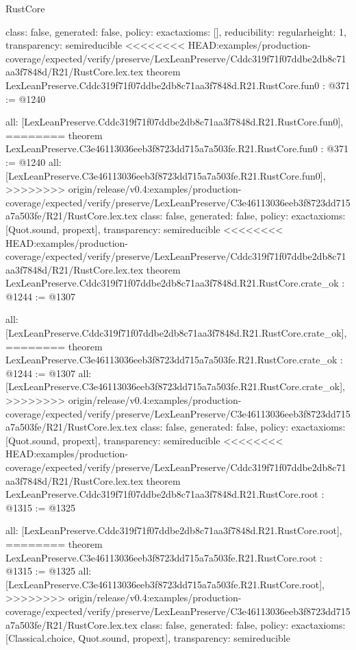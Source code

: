 \begin{lexlean}{RustCore}
\begin{coremodule}
{\begin{coremodule}
{{{  class: false,
  generated: false,
  policy: exact{axioms: []},
  reducibility: regular{height: 1},
  transparency: semireducible
}
<<<<<<<< HEAD:examples/production-coverage/expected/verify/preserve/LexLeanPreserve/Cddc319f71f07ddbe2db8c71aa3f7848d/R21/RustCore.lex.tex
theorem LexLeanPreserve.Cddc319f71f07ddbe2db8c71aa3f7848d.R21.RustCore.fun0 : @371 := @1240 {
  all: [LexLeanPreserve.Cddc319f71f07ddbe2db8c71aa3f7848d.R21.RustCore.fun0],
========
theorem LexLeanPreserve.C3e46113036eeb3f8723dd715a7a503fe.R21.RustCore.fun0 : @371 := @1240 {
  all: [LexLeanPreserve.C3e46113036eeb3f8723dd715a7a503fe.R21.RustCore.fun0],
>>>>>>>> origin/release/v0.4:examples/production-coverage/expected/verify/preserve/LexLeanPreserve/C3e46113036eeb3f8723dd715a7a503fe/R21/RustCore.lex.tex
  class: false,
  generated: false,
  policy: exact{axioms: [Quot.sound, propext]},
  transparency: semireducible
}
<<<<<<<< HEAD:examples/production-coverage/expected/verify/preserve/LexLeanPreserve/Cddc319f71f07ddbe2db8c71aa3f7848d/R21/RustCore.lex.tex
theorem LexLeanPreserve.Cddc319f71f07ddbe2db8c71aa3f7848d.R21.RustCore.crate_ok : @1244 := @1307 {
  all: [LexLeanPreserve.Cddc319f71f07ddbe2db8c71aa3f7848d.R21.RustCore.crate_ok],
========
theorem LexLeanPreserve.C3e46113036eeb3f8723dd715a7a503fe.R21.RustCore.crate_ok : @1244 := @1307 {
  all: [LexLeanPreserve.C3e46113036eeb3f8723dd715a7a503fe.R21.RustCore.crate_ok],
>>>>>>>> origin/release/v0.4:examples/production-coverage/expected/verify/preserve/LexLeanPreserve/C3e46113036eeb3f8723dd715a7a503fe/R21/RustCore.lex.tex
  class: false,
  generated: false,
  policy: exact{axioms: [Quot.sound, propext]},
  transparency: semireducible
}
<<<<<<<< HEAD:examples/production-coverage/expected/verify/preserve/LexLeanPreserve/Cddc319f71f07ddbe2db8c71aa3f7848d/R21/RustCore.lex.tex
theorem LexLeanPreserve.Cddc319f71f07ddbe2db8c71aa3f7848d.R21.RustCore.root : @1315 := @1325 {
  all: [LexLeanPreserve.Cddc319f71f07ddbe2db8c71aa3f7848d.R21.RustCore.root],
========
theorem LexLeanPreserve.C3e46113036eeb3f8723dd715a7a503fe.R21.RustCore.root : @1315 := @1325 {
  all: [LexLeanPreserve.C3e46113036eeb3f8723dd715a7a503fe.R21.RustCore.root],
>>>>>>>> origin/release/v0.4:examples/production-coverage/expected/verify/preserve/LexLeanPreserve/C3e46113036eeb3f8723dd715a7a503fe/R21/RustCore.lex.tex
  class: false,
  generated: false,
  policy: exact{axioms: [Classical.choice, Quot.sound, propext]},
  transparency: semireducible
}

}}}}}
\end{coremodule}}
\end{coremodule}
\end{lexlean}
